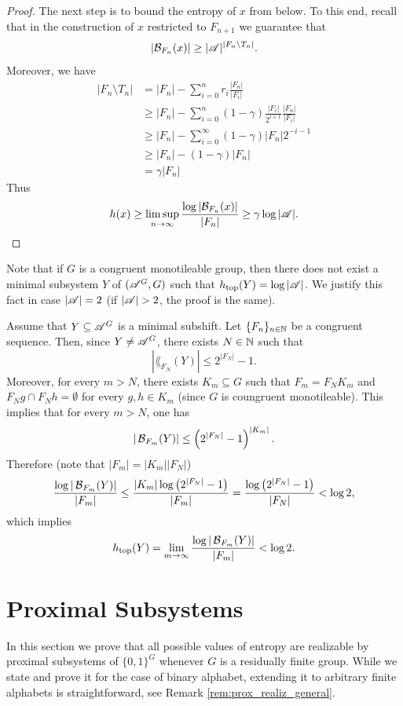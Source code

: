 \begin{proof}
The next step is to bound the entropy of $x$ from below. To this end, recall that in the construction of $x$ restricted to $F_{n+1}$ we guarantee that
\[
|\mathcal B_{F_n}(x)|\geq |\mathscr{A}|^{|F_n\setminus T_n|}.
\]
Moreover, we have
\begin{align*}
|F_n \setminus T_n|& = |F_n| - \sum_{i=0}^n r_i \frac{|F_n|}{|F_i|}\\
&\geq  |F_n| - \sum_{i=0}^n(1-\gamma)\frac{|F_i|}{2^{i+1}}\frac{|F_n|}{|F_i|}\\
&\geq |F_n| - \sum_{i=0}^\infty (1-\gamma)|F_n| 2^{-i-1}\\
&\geq |F_n| - (1-\gamma)|F_n|\\
& = \gamma|F_n|
\end{align*}
Thus
\[h(x)\geq\limsup\limits_{n\to\infty}\frac{\log|\mathcal B_{F_n}(x)|}{|F_n|}\geq \gamma\log|\mathscr{A}|.\qedhere\]
\end{proof}

\begin{rem}
Note that if $G$ is a congruent monotileable group, then there does not exist a minimal subsystem $Y$ of $(\mathscr{A}^G,G)$ such that $h_\mathrm{top}(Y)=\log|\mathscr{A}|$. We justify this fact in case $|\mathscr{A}|=2$ (if $|\alf|>2$, the proof is the same). 

Assume that $Y\subseteq \mathscr{A}^G$ is a minimal subshift.
Let $\{F_n\}_{n\in\mathbb{N}}$ be a congruent \Folner sequence. 
Then, since $Y\neq\mathscr{A}^G$, there exists $N\in\mathbb{N}$ such that
\[
|\lang_{F_N}(Y)|\leq 2^{|F_N|}-1.
\]
Moreover, for every $m>N$, there exists $K_m\subseteq G$ such that $F_m = F_NK_m$ and $F_Ng\cap F_Nh=\emptyset$ for every $g,h\in K_m$ (since $G$ is coungruent monotileable). This implies that for every $m>N$, one has
\[
|\operatorname{\mathcal{B}}_{F_m}(Y)|\leq \left( 2^{|F_N|}-1\right)^{|K_m|}.
\]
Therefore (note that $|F_m|=|K_m||F_N|$)
\[
\frac{\log|\operatorname{\mathcal{B}}_{F_m}(Y)|}{|F_m|}\leq \frac{|K_m|\log\left( 2^{|F_N|}-1\right)}{|F_m|} =  \frac{\log\left( 2^{|F_N|}-1\right)}{|F_N|}<\log2,
\]
which implies
\[
h_\mathrm{top}(Y) = \lim_{m\to\infty} \frac{\log|\operatorname{\mathcal{B}}_{F_m}(Y)|}{|F_m|} <{\log2}.
\]

\end{rem}


\section{Proximal Subsystems}

In this section we prove that all possible values of entropy are realizable by proximal subsystems of $\{0,1\}^G$ whenever $G$ is a  residually finite group. While we state and prove it for the case of binary alphabet, extending it to arbitrary finite alphabets is straightforward, see Remark \ref{rem:prox_realiz_general}.

